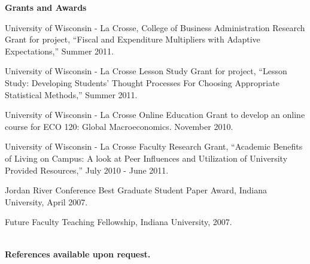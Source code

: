 \documentclass[11pt]{article}
\newcommand{\bd}{\begin{description}}
\newcommand{\ed}{\end{description}}
\newcommand{\toprule}{\par\vspace*{2pt}\noindent{\hrule\hfill}\par\vspace*{1pt}}
\begin{document}
\noindent \textbf{Grants and Awards} \toprule
\bd
\item University of Wisconsin - La Crosse, College of Business Administration Research Grant for project, ``Fiscal and Expenditure Multipliers with Adaptive Expectations,'' Summer 2011.
\item University of Wisconsin - La Crosse Lesson Study Grant for project, ``Lesson Study: Developing Students' Thought Processes For Choosing Appropriate Statistical Methods,'' Summer 2011.
\item University of Wisconsin - La Crosse Online Education Grant to develop an online course for ECO 120: Global Macroeconomics. November 2010.
\item University of Wisconsin - La Crosse Faculty Research Grant, ``Academic Benefits of Living on Campus: A look at Peer Influences and Utilization of University Provided Resources,'' July 2010 - June 2011. 
\item Jordan River Conference Best Graduate Student Paper Award, Indiana University, April 2007. 
\item Future Faculty Teaching Fellowship, Indiana University, 2007. \\ \\
\ed

\noindent \textbf{References available upon request.} \toprule
\end{document}
